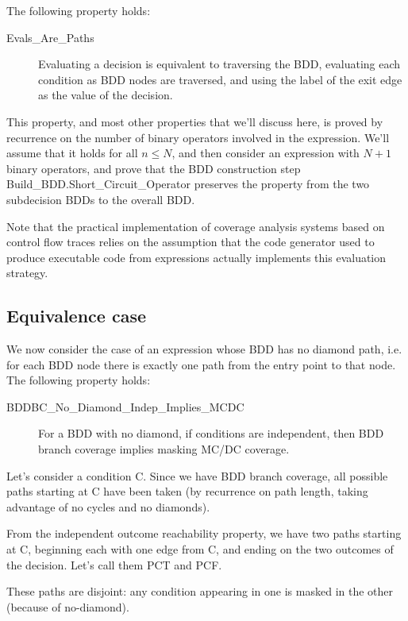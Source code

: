 \documentclass[a4paper,12pt,twoside]{article}
\renewcommand{\le}{\leqslant}
\begin{document}
The following property holds:

\begin{description}
\item[Evals\_Are\_Paths]
  Evaluating a decision is equivalent to traversing the BDD, evaluating
  each condition as BDD nodes are traversed, and using the label of the
  exit edge as the value of the decision.
\end{description}

This property, and most other properties that we'll discuss here,
is proved by recurrence on the number of binary operators involved in
the expression. We'll assume that it holds for all $n \le{} N$, and then
consider an expression with $N+1$ binary operators, and prove that
the BDD construction step Build\_BDD.Short\_Circuit\_Operator preserves
the property from the two subdecision BDDs to the overall BDD.

Note that the practical implementation of coverage analysis systems based
on control flow traces relies on the assumption that the code generator
used to produce executable code from expressions actually implements this
evaluation strategy.

\subsection{Equivalence case}

We now consider the case of an expression whose BDD has no diamond path,
i.e. for each BDD node there is exactly one path from the entry point to
that node. The following property holds:

\begin{description}
\item[BDDBC\_No\_Diamond\_Indep\_Implies\_MCDC]
  For a BDD with no diamond, if conditions are independent, then
  BDD branch coverage implies masking MC/DC coverage.
\end{description}

Let's consider a condition C. Since we have BDD branch coverage,
all possible paths starting at C have been taken (by recurrence on path
length, taking advantage of no cycles and no diamonds).

From the independent outcome reachability property, we have two paths
starting at C, beginning each with one edge from C, and ending on the
two outcomes of the decision. Let's call them PCT and PCF.

These paths are disjoint: any condition appearing in one is masked
in the other (because of no-diamond).
\end{document}
